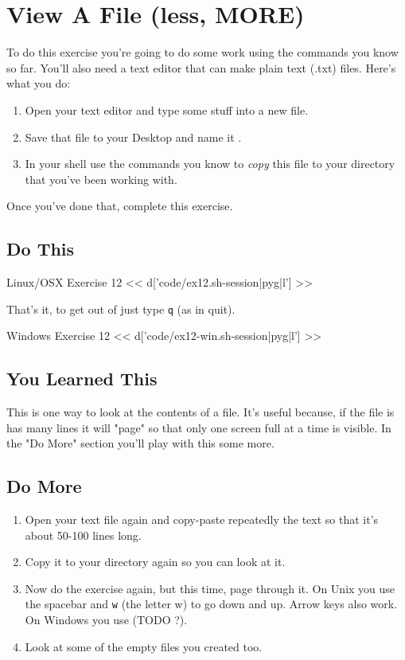 \chapter{View A File (less, MORE)}

To do this exercise you're going to do some work using the commands you know so far.
You'll also need a text editor that can make plain text (.txt) files.  Here's
what you do:

\begin{enumerate}
\item Open your text editor and type some stuff into a new file.
\item Save that file to your Desktop and name it .
\item In your shell use the commands you know to \emph{copy} this file
    to your  directory that you've been working with.
\end{enumerate}

Once you've done that, complete this exercise.

\section{Do This}

\begin{code}{Linux/OSX Exercise 12}
<< d['code/ex12.sh-session|pyg|l'] >>
\end{code}

That's it, to get out of  just type \verb|q| (as in quit).

\begin{code}{Windows Exercise 12}
<< d['code/ex12-win.sh-session|pyg|l'] >>
\end{code}

\section{You Learned This}

This is one way to look at the contents of a file.  It's useful because, if the
file is has many lines it will "page" so that only one screen full at a time
is visible.  In the "Do More" section you'll play with this some more.


\section{Do More}

\begin{enumerate}
\item Open your text file again and copy-paste repeatedly the text so that it's about 50-100 lines long.
\item Copy it to your  directory again so you can look at it.
\item Now do the exercise again, but this time, page through it.  On Unix you use
    the spacebar and \verb|w| (the letter w) to go down and up.  Arrow keys also work.  On Windows you use (TODO ?).
\item Look at some of the empty files you created too.
\end{enumerate}

